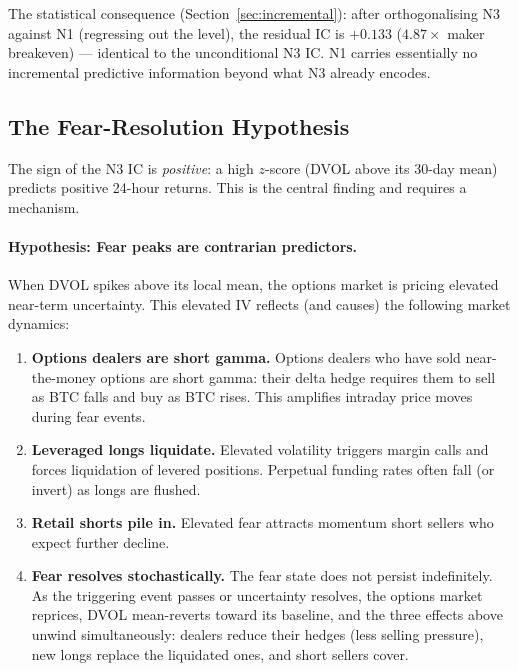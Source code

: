 \documentclass[12pt, a4paper]{article}
\theoremstyle{plain}
\theoremstyle{definition}
\begin{document}
The statistical consequence (Section~\ref{sec:incremental}): after
orthogonalising N3 against N1 (regressing out the level), the residual IC
is $+0.133$ ($4.87\times$ maker breakeven) --- identical to the unconditional
N3 IC. N1 carries essentially no incremental predictive information beyond
what N3 already encodes.

\subsection{The Fear-Resolution Hypothesis}
\label{sec:mechanism}

The sign of the N3 IC is \emph{positive}: a high $z$-score (DVOL above its
30-day mean) predicts positive 24-hour returns. This is the central finding
and requires a mechanism.

\paragraph{Hypothesis: Fear peaks are contrarian predictors.}
When DVOL spikes above its local mean, the options market is pricing elevated
near-term uncertainty. This elevated IV reflects (and causes) the following
market dynamics:

\begin{enumerate}
  \item \textbf{Options dealers are short gamma.} Options dealers who have
        sold near-the-money options are short gamma: their delta hedge requires
        them to sell as BTC falls and buy as BTC rises. This amplifies intraday
        price moves during fear events.

  \item \textbf{Leveraged longs liquidate.} Elevated volatility triggers
        margin calls and forces liquidation of levered positions. Perpetual
        funding rates often fall (or invert) as longs are flushed.

  \item \textbf{Retail shorts pile in.} Elevated fear attracts momentum
        short sellers who expect further decline.

  \item \textbf{Fear resolves stochastically.} The fear state does not persist
        indefinitely. As the triggering event passes or uncertainty resolves,
        the options market reprices, DVOL mean-reverts toward its baseline, and
        the three effects above unwind simultaneously: dealers
        reduce their hedges (less selling pressure), new longs replace the
        liquidated ones, and short sellers cover.
\end{enumerate}
\end{document}
